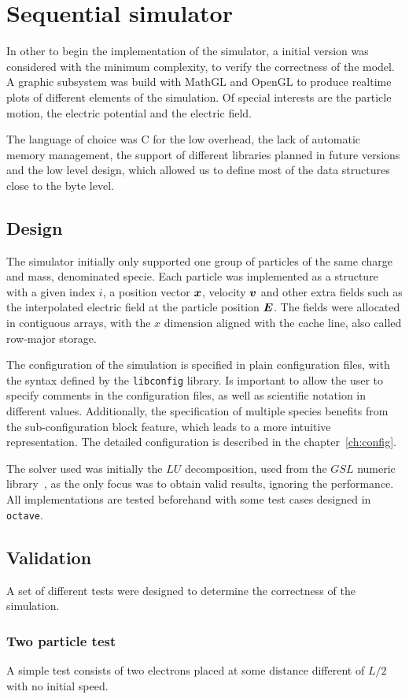 \chapter{Sequential simulator}
\label{ch:sequential}

In other to begin the implementation of the simulator, a initial version was
considered with the minimum complexity, to verify the correctness of the model.
A graphic subsystem was build with MathGL and OpenGL to produce realtime plots
of different elements of the simulation. Of special interests are the particle
motion, the electric potential and the electric field.

The language of choice was C for the low overhead, the lack of automatic memory
management, the support of different libraries planned in future versions and
the low level design, which allowed us to define most of the data structures
close to the byte level.

\section{Design}

The simulator initially only supported one group of particles of the same charge
and mass, denominated specie. Each particle was implemented as a structure with
a given index $i$, a position vector $\bm{x}$, velocity $\bm{v}$ and other extra fields
such as the interpolated electric field at the particle position $\bm{E}$.
%
The fields were allocated in contiguous arrays, with the $x$ dimension aligned
with the cache line, also called row-major storage.

The configuration of the simulation is specified in plain configuration files,
with the syntax defined by the \texttt{libconfig} library. Is important to allow
the user to specify comments in the configuration files, as well as scientific
notation in different values. Additionally, the specification of multiple species
benefits from the sub-configuration block feature, which leads to a more
intuitive representation. The detailed configuration is described in the
chapter~\ref{ch:config}.

The solver used was initially the $LU$ decomposition, used from the $GSL$
numeric library~\cite{gsl}, as the only focus was to obtain valid results, ignoring the
performance. All implementations are tested beforehand with some test cases
designed in \texttt{octave}.

\section{Validation}

A set of different tests were designed to determine the correctness of the
simulation.

\subsection{Two particle test}

A simple test consists of two electrons placed at some distance different of
$L/2$ with no initial speed.
